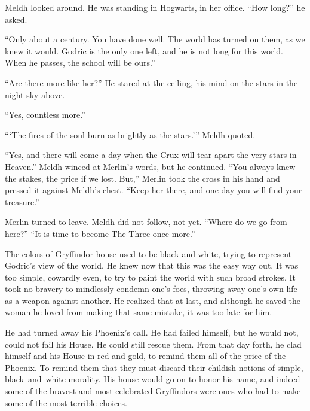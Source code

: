 Meldh looked around. He was standing in Hogwarts, in her office. “How long?” he asked.

“Only about a century. You have done well. The world has turned on them, as we knew it would. Godric is the only one left, and he is not long for this world. When he passes, the school will be ours.”

“Are there more like her?” He stared at the ceiling, his mind on the stars in the night sky above.

“Yes, countless more.”

“‘The fires of the soul burn as brightly as the stars.'” Meldh quoted.

“Yes, and there will come a day when the Crux will tear apart the very stars in Heaven.” Meldh winced at Merlin’s words, but he continued. “You always knew the stakes, the price if we lost. But,” Merlin took the cross in his hand and pressed it against Meldh’s chest. “Keep her there, and one day you will find your treasure.”
\pagebreak

Merlin turned to leave. Meldh did not follow, not yet. “Where do we go from here?”
\SmallVSpace
“It is time to become The Three once more.”
\simpleline

The colors of Gryffindor house used to be black and white, trying to represent Godric’s view of the world. He knew now that this was the easy way out. It was too simple, cowardly even, to try to paint the world with such broad strokes. It took no bravery to mindlessly condemn one’s foes, throwing away one’s own life as a weapon against another. He realized that at last, and although he saved the woman he loved from making that same mistake, it was too late for him.

He had turned away his Phoenix’s call. He had failed himself, but he would not, could not fail his House. He could still rescue them. From that day forth, he clad himself and his House in red and gold, to remind them all of the price of the Phoenix. To remind them that they must discard their childish notions of simple, black\mbox{--}and\mbox{--}white morality. His house would go on to honor his name, and indeed some of the bravest and most celebrated Gryffindors were ones who had to make some of the most terrible choices.

